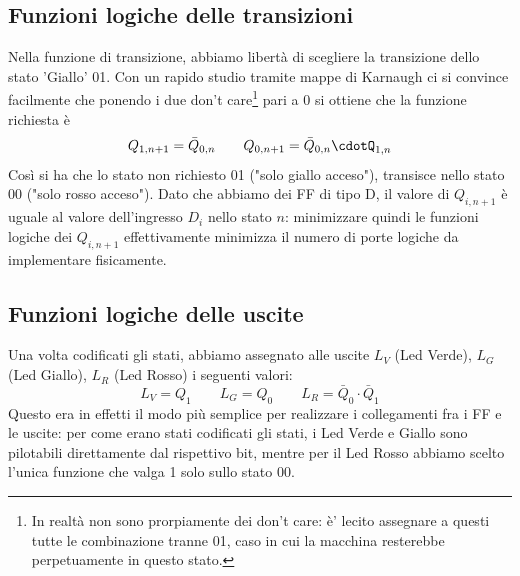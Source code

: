 \documentclass[10pt,a4paper]{article}
\begin{document}
\subsection{Funzioni logiche delle transizioni}
Nella funzione di transizione, abbiamo libertà di scegliere la transizione dello stato 'Giallo' 01.
Con un rapido studio tramite mappe di Karnaugh ci si convince facilmente che ponendo i due don't care\footnote{In realtà non sono prorpiamente dei don't care: è' lecito assegnare a questi  tutte le combinazione tranne 01, caso in cui la macchina resterebbe perpetuamente in questo stato.} pari a 0 si ottiene che la funzione richiesta è \begin{equation}
Q_{1, n+1} = \bar{Q}_{0,n}\qquad Q_{0,n+1} = \bar{Q}_{0,n}\cdotQ_{1,n} 
\end{equation}
Così si ha che lo stato non richiesto 01 ("solo giallo acceso"), transisce nello stato 00 ("solo rosso acceso").
Dato che abbiamo dei FF di tipo D, il valore di $Q_{i, n+1}$ è uguale al valore dell'ingresso $D_i$ nello stato $n$: minimizzare quindi le funzioni logiche dei $Q_{i,n+1}$ effettivamente minimizza il numero di porte logiche da implementare fisicamente.
\subsection{Funzioni logiche delle uscite}
Una volta codificati gli stati, abbiamo assegnato alle uscite $L_V$ (Led Verde), $L_G$ (Led Giallo), $L_R$ (Led Rosso) i seguenti valori:
\begin{equation}
L_V = Q_1 \qquad L_G = Q_0 \qquad L_R = \bar{Q}_0\cdot \bar{Q}_1
\end{equation}
Questo era in effetti il modo più semplice per realizzare i collegamenti fra i FF e le uscite: per come erano stati codificati gli stati, i Led Verde e Giallo sono pilotabili direttamente dal rispettivo bit, mentre per il Led Rosso abbiamo scelto l'unica funzione che valga 1 solo sullo stato 00. %
\end{document}
